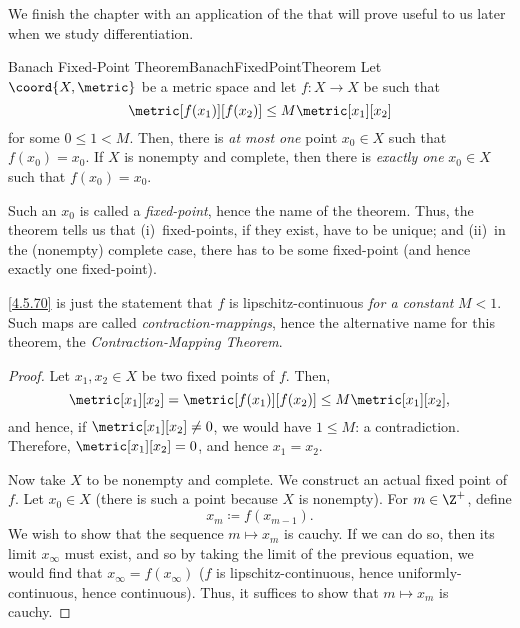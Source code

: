 We finish the chapter with an application of the  that will prove useful to us later when we study differentiation.
\begin{thm}{Banach Fixed-Point Theorem}{BanachFixedPointTheorem}
Let $\coord{X,\metric}$ be a metric space and let $f\colon X\rightarrow X$ be such that
\begin{equation}\label{4.5.70}
\metric[f(x_1)][f(x_2)]\leq M\metric[x_1][x_2]
\end{equation}
for some $0\leq 1<M$.  Then, there is \emph{at most one} point $x_0\in X$ such that $f(x_0)=x_0$.  If $X$ is nonempty and complete, then there is \emph{exactly one} $x_0\in X$ such that $f(x_0)=x_0$.
\begin{rmk}
Such an $x_0$ is called a \emph{fixed-point}, hence the name of the theorem.  Thus, the theorem tells us that (i)~fixed-points, if they exist, have to be unique; and (ii)~in the (nonempty) complete case, there has to be some fixed-point (and hence exactly one fixed-point).
\end{rmk}
\begin{rmk}
\eqref{4.5.70} is just the statement that $f$ is lipschitz-continuous \emph{for a constant} $M<1$.  Such maps are called \emph{contraction-mappings}, hence the alternative name for this theorem, the \emph{Contraction-Mapping Theorem}.
\end{rmk}
\begin{proof}
Let $x_1,x_2\in X$ be two fixed points of $f$.  Then,
\begin{equation}
\metric[x_1][x_2]=\metric[f(x_1)][f(x_2)]\leq M\metric[x_1][x_2],
\end{equation}
and hence, if $\metric[x_1][x_2]\neq 0$, we would have $1\leq M$:  a contradiction.  Therefore, $\metric[x_1][x_2]=0$, and hence $x_1=x_2$.

Now take $X$ to be nonempty and complete.  We construct an actual fixed point of $f$.  Let $x_0\in X$ (there is such a point because $X$ is nonempty).  For $m\in \Z ^+$, define
\begin{equation}
x_m\coloneqq f(x_{m-1}).
\end{equation}
We wish to show that the sequence $m\mapsto x_m$ is cauchy.  If we can do so, then its limit $x_\infty$ must exist, and so by taking the limit of the previous equation, we would find that $x_\infty =f(x_\infty )$ ($f$ is lipschitz-continuous, hence uniformly-continuous, hence continuous).  Thus, it suffices to show that $m\mapsto x_m$ is cauchy.


\end{proof}
\end{thm}
